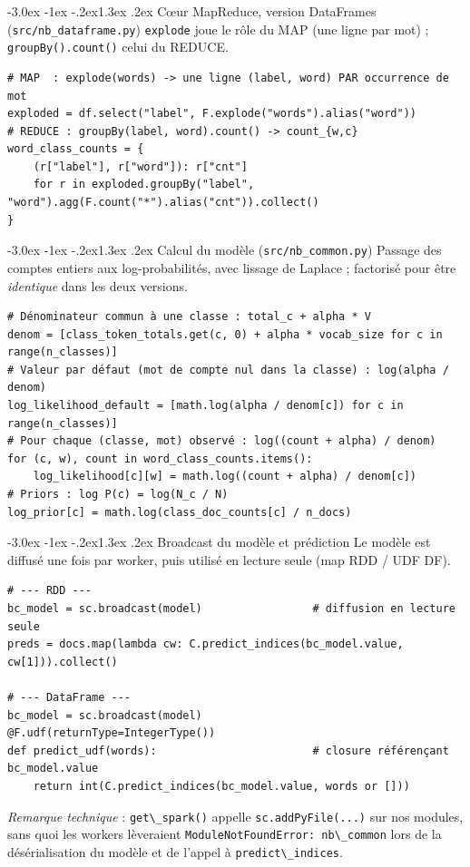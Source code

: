 \documentclass[11pt,a4paper]{article}
\makeatletter
\newcommand{\code}[1]{\lstinline[style=py]!#1!}
\renewcommand\subsection{\@startsection{subsection}{2}{\z@}%
  {-3.0ex \@plus -1ex \@minus -.2ex}{1.3ex \@plus.2ex}%
  {\normalfont\large\bfseries\color{primary!88!black}}}
\makeatother
\begin{document}
\subsection{Cœur MapReduce, version DataFrames (\texttt{src/nb\_dataframe.py})}
\code{explode} joue le rôle du MAP (une ligne par mot) ; \code{groupBy().count()} celui du
REDUCE.
\begin{lstlisting}[style=py]
# MAP  : explode(words) -> une ligne (label, word) PAR occurrence de mot
exploded = df.select("label", F.explode("words").alias("word"))
# REDUCE : groupBy(label, word).count() -> count_{w,c}
word_class_counts = {
    (r["label"], r["word"]): r["cnt"]
    for r in exploded.groupBy("label", "word").agg(F.count("*").alias("cnt")).collect()
}
\end{lstlisting}

\subsection{Calcul du modèle (\texttt{src/nb\_common.py})}
Passage des comptes entiers aux log-probabilités, avec lissage de Laplace ; factorisé pour
être \emph{identique} dans les deux versions.
\begin{lstlisting}[style=py]
# Dénominateur commun à une classe : total_c + alpha * V
denom = [class_token_totals.get(c, 0) + alpha * vocab_size for c in range(n_classes)]
# Valeur par défaut (mot de compte nul dans la classe) : log(alpha / denom)
log_likelihood_default = [math.log(alpha / denom[c]) for c in range(n_classes)]
# Pour chaque (classe, mot) observé : log((count + alpha) / denom)
for (c, w), count in word_class_counts.items():
    log_likelihood[c][w] = math.log((count + alpha) / denom[c])
# Priors : log P(c) = log(N_c / N)
log_prior[c] = math.log(class_doc_counts[c] / n_docs)
\end{lstlisting}

\subsection{Broadcast du modèle et prédiction}
Le modèle est diffusé une fois par worker, puis utilisé en lecture seule (map RDD / UDF DF).
\begin{lstlisting}[style=py]
# --- RDD ---
bc_model = sc.broadcast(model)                 # diffusion en lecture seule
preds = docs.map(lambda cw: C.predict_indices(bc_model.value, cw[1])).collect()

# --- DataFrame ---
bc_model = sc.broadcast(model)
@F.udf(returnType=IntegerType())
def predict_udf(words):                        # closure référençant bc_model.value
    return int(C.predict_indices(bc_model.value, words or []))
\end{lstlisting}
\emph{Remarque technique} : \code{get\_spark()} appelle \code{sc.addPyFile(...)} sur nos
modules, sans quoi les workers lèveraient \code{ModuleNotFoundError: nb\_common} lors de la
désérialisation du modèle et de l'appel à \code{predict\_indices}.
\end{document}
